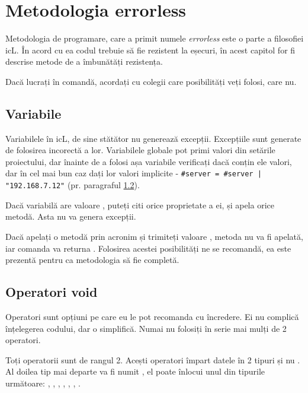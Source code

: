 
\section{Metodologia errorless}

\label{errorless-sec}

Metodologia de programare, care a primit numele \textit{errorless} este o parte a filosofiei icL. În acord cu ea codul trebuie să fie rezistent la eșecuri, în acest capitol for fi descrise metode de a îmbunătăți rezistența.

Dacă lucrați în comandă, acordați cu colegii care posibilități veți folosi, care nu.

\subsection{Variabile}

Variabilele în icL, de sine stătător nu generează excepții. Excepțiile sunt generate de folosirea incorectă a lor. Variabilele globale pot primi valori din setările proiectului, dar înainte de a folosi așa variabile verificați dacă conțin ele valori, dar în cel mai bun caz dați lor valori implicite - \lstinline`#server = #server | "192.168.7.12"` (pr. paragraful \ref{void-operators}).

Dacă variabilă are valoare \void, puteți citi orice proprietate a ei, și apela orice metodă. Asta nu va genera excepții.

Dacă apelați o metodă prin acronim și trimiteți valoare \void, metoda nu va fi apelată, iar comanda va returna \void. Folosirea acestei posibilități ne se recomandă, ea este prezentă pentru ca metodologia să fie completă.

\subsection{Operatori {\color{lightblue}void}}

\label{void-operators}

Operatori \void{} sunt opțiuni pe care eu le pot recomanda cu încredere. Ei nu complică înțelegerea codului, dar o simplifică. Numai nu folosiți în serie mai mulți de 2 operatori.

Toți operatorii \void{} sunt de rangul 2. Acești operatori împart datele în 2 tipuri \void{} și nu \void{}. Al doilea tip mai departe va fi numit , el poate înlocui unul din tipurile următoare: \integer{}, \double{}, \str{}, \listtype{}, \object{}, \set{}, \element{}.

